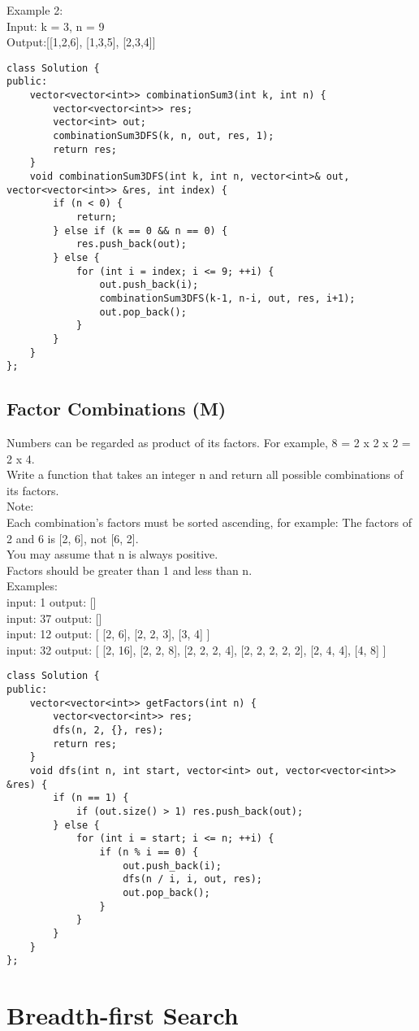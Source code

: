 Example 2:\\
Input: k = 3, n = 9\\
Output:[[1,2,6], [1,3,5], [2,3,4]]\\

\begin{lstlisting}
class Solution {
public:
    vector<vector<int>> combinationSum3(int k, int n) {
        vector<vector<int>> res;
        vector<int> out;
        combinationSum3DFS(k, n, out, res, 1);
        return res;
    }
    void combinationSum3DFS(int k, int n, vector<int>& out, vector<vector<int>> &res, int index) {
        if (n < 0) {
            return;
        } else if (k == 0 && n == 0) {
            res.push_back(out);
        } else {
            for (int i = index; i <= 9; ++i) {
                out.push_back(i);
                combinationSum3DFS(k-1, n-i, out, res, i+1);
                out.pop_back();
            }
        }
    }
};
\end{lstlisting}


\subsection{Factor Combinations (M)}
Numbers can be regarded as product of its factors. For example, 8 = 2 x 2 x 2 = 2 x 4.\\

Write a function that takes an integer n and return all possible combinations of its factors.\\

Note: \\
    Each combination's factors must be sorted ascending, for example: The factors of 2 and 6 is [2, 6], not [6, 2].\\
    You may assume that n is always positive.\\
    Factors should be greater than 1 and less than n.\\

Examples: \\
input: 1
output: 
[]\\

input: 37
output: 
[]\\

input: 12
output:
[
  [2, 6],
  [2, 2, 3],
  [3, 4]
]\\

input: 32
output:
[
  [2, 16],
  [2, 2, 8],
  [2, 2, 2, 4],
  [2, 2, 2, 2, 2],
  [2, 4, 4],
  [4, 8]
]\\

\begin{lstlisting}
class Solution {
public:
    vector<vector<int>> getFactors(int n) {
        vector<vector<int>> res;
        dfs(n, 2, {}, res);
        return res;
    }
    void dfs(int n, int start, vector<int> out, vector<vector<int>> &res) {
        if (n == 1) {
            if (out.size() > 1) res.push_back(out);
        } else {
            for (int i = start; i <= n; ++i) {
                if (n % i == 0) {
                    out.push_back(i);
                    dfs(n / i, i, out, res);
                    out.pop_back();
                }
            }
        }
    }
};
\end{lstlisting}


\section{Breadth-first Search}
